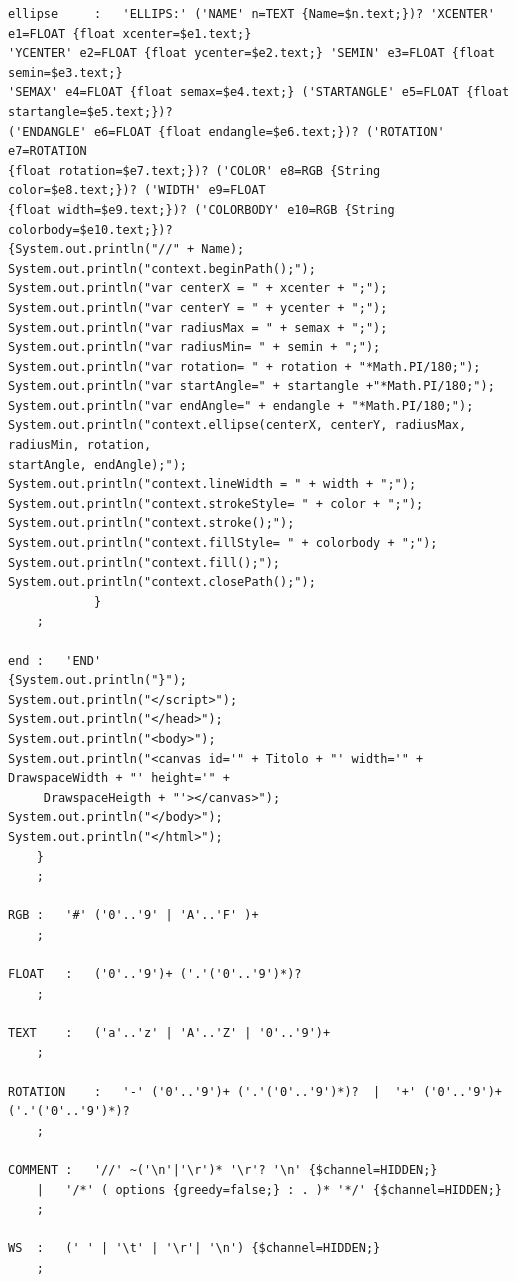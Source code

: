 \documentclass[a4paper]{article}
\begin{document}
\begin{verbatim}
ellipse 	:	'ELLIPS:' ('NAME' n=TEXT {Name=$n.text;})? 'XCENTER' e1=FLOAT {float xcenter=$e1.text;} 
'YCENTER' e2=FLOAT {float ycenter=$e2.text;} 'SEMIN' e3=FLOAT {float semin=$e3.text;} 
'SEMAX' e4=FLOAT {float semax=$e4.text;} ('STARTANGLE' e5=FLOAT {float startangle=$e5.text;})? 
('ENDANGLE' e6=FLOAT {float endangle=$e6.text;})? ('ROTATION' e7=ROTATION 
{float rotation=$e7.text;})? ('COLOR' e8=RGB {String color=$e8.text;})? ('WIDTH' e9=FLOAT 
{float width=$e9.text;})? ('COLORBODY' e10=RGB {String colorbody=$e10.text;})?
{System.out.println("//" + Name);
System.out.println("context.beginPath();");
System.out.println("var centerX = " + xcenter + ";");
System.out.println("var centerY = " + ycenter + ";");
System.out.println("var radiusMax = " + semax + ";");
System.out.println("var radiusMin= " + semin + ";");
System.out.println("var rotation= " + rotation + "*Math.PI/180;");
System.out.println("var startAngle=" + startangle +"*Math.PI/180;");
System.out.println("var endAngle=" + endangle + "*Math.PI/180;");
System.out.println("context.ellipse(centerX, centerY, radiusMax, radiusMin, rotation, 
startAngle, endAngle);");
System.out.println("context.lineWidth = " + width + ";");
System.out.println("context.strokeStyle= " + color + ";");
System.out.println("context.stroke();");
System.out.println("context.fillStyle= " + colorbody + ";");
System.out.println("context.fill();");
System.out.println("context.closePath();");
			}
	;

end	:	'END'
{System.out.println("}");
System.out.println("</script>");
System.out.println("</head>");
System.out.println("<body>");
System.out.println("<canvas id='" + Titolo + "' width='" + DrawspaceWidth + "' height='" + 
	 DrawspaceHeigth + "'></canvas>");
System.out.println("</body>");
System.out.println("</html>");
	}
	;

RGB	:	'#' ('0'..'9' | 'A'..'F' )+
	;

FLOAT	:   ('0'..'9')+ ('.'('0'..'9')*)?
    ;

TEXT	:	('a'..'z' | 'A'..'Z' | '0'..'9')+
	;

ROTATION	:	'-' ('0'..'9')+ ('.'('0'..'9')*)?  |  '+' ('0'..'9')+ ('.'('0'..'9')*)?
	;

COMMENT	:   '//' ~('\n'|'\r')* '\r'? '\n' {$channel=HIDDEN;}
    |   '/*' ( options {greedy=false;} : . )* '*/' {$channel=HIDDEN;}
    ;
    
WS	:   (' ' | '\t' | '\r'| '\n') {$channel=HIDDEN;}
    ;

\end{verbatim}
\newpage
\end{document}
